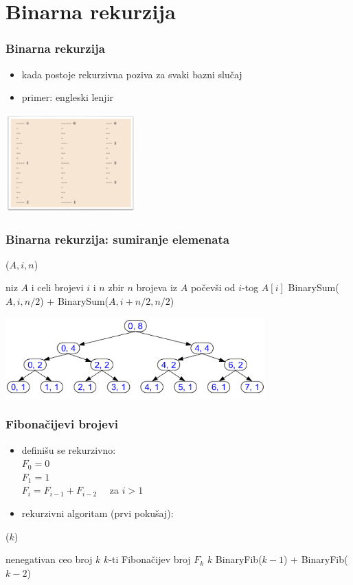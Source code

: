 \documentclass[compress]{beamer}
\begin{document}
\section[Binarna rekurzija]{Binarna rekurzija}
\begin{frame}[fragile]
  \frametitle{Binarna rekurzija}
  \begin{itemize}
    \item kada postoje  rekurzivna poziva za svaki bazni slučaj
    \item primer: engleski lenjir
  \end{itemize}
  \begin{center}
    \includegraphics[width=5cm]{asp-02-pic02.png}
  \end{center}
\end{frame}

\begin{frame}[fragile]
  \frametitle{Binarna rekurzija: sumiranje elemenata}
($A, i, n$)
\begin{algorithmic}
\REQUIRE niz $A$ i celi brojevi $i$ i $n$
\ENSURE zbir $n$ brojeva iz $A$ počevši od $i$-tog
  \RETURN $A[i]$
\ELSE
  \RETURN BinarySum($A, i, n/2$) + BinarySum($A, i+n/2, n/2$)
\ENDIF
\end{algorithmic}
  \begin{center}
    \includegraphics[width=10cm]{asp-02-pic07.png}
  \end{center}
\end{frame}

\begin{frame}[fragile]
  \frametitle{Fibonačijevi brojevi}
\begin{itemize}
  \item definišu se rekurzivno: \\
  $ F_0 = 0$ \\
  $ F_1 = 1$ \\
  $ F_i = F_{i-1} + F_{i-2} \quad $ za $i>1$ 
  \item rekurzivni algoritam (prvi pokušaj):
\end{itemize}
($k$)
\begin{algorithmic}
\REQUIRE nenegativan ceo broj $k$
\ENSURE $k$-ti Fibonačijev broj $F_k$
  \RETURN $k$
\ELSE
  \RETURN BinaryFib($k-1$) + BinaryFib($k-2$)
\ENDIF
\end{algorithmic}
\end{frame}
\end{document}
